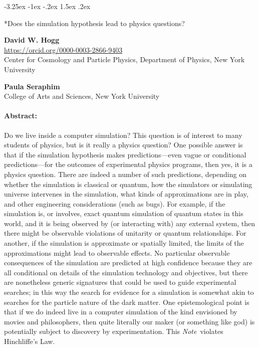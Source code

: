 \documentclass[12pt,letterpaper]{article}
\makeatletter
\renewcommand\section{\@startsection {section}{1}{\z@}%
  {-3.25ex \@plus -1ex \@minus -.2ex}%
  {1.5ex \@plus .2ex}%
  {\raggedright\normalfont\large\bfseries}}
\newcommand{\documentname}{\textsl{Note}}
\makeatother
\begin{document}
\section*{Does the simulation hypothesis lead to physics questions?}

\medskip\noindent
\textbf{David W. Hogg}
{\footnotesize~\\\url{https://orcid.org/0000-0003-2866-9403}\\Center for Cosmology and Particle Physics, Department of Physics, New York University}

\medskip\noindent
\textbf{Paula Seraphim}
{\footnotesize~\\College of Arts and Sciences, New York University}

\paragraph{Abstract:}
Do we live inside a computer simulation?
This question is of interest to many students of physics, but is it really a physics question?
One possible answer is that if the simulation hypothesis makes predictions---even vague or conditional predictions---for the outcomes of experimental physics programs, then yes, it is a physics question.
There are indeed a number of such predictions, depending on whether the simulation is classical or quantum, how the simulators or simulating universe intervenes in the simulation, what kinds of approximations are in play, and other engineering considerations (such as bugs).
For example, if the simulation is, or involves, exact quantum simulation of quantum states in this world, and it is being observed by (or interacting with) any external system, then there might be observable violations of unitarity or quantum relationships.
For another, if the simulation is approximate or spatially limited, the limits of the approximations might lead to observable effects.
No particular observable consequences of the simulation are predicted at high confidence because they are all conditional on details of the simulation technology and objectives, but there are nonetheless generic signatures that could be used to guide experimental searches; in this way the search for evidence for a simulation is somewhat akin to searches for the particle nature of the dark matter.
One epistemological point is that if we do indeed live in a computer simulation of the kind envisioned by movies and philosophers, then quite literally our maker (or something like god) is potentially subject to discovery by experimentation.
This \documentname\ violates Hinchliffe's Law.
\end{document}
